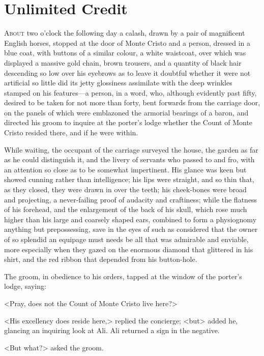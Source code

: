 \chapter{Unlimited Credit} 

 \lettrine{A}{bout} two o'clock the following day a calash, drawn by a pair of magnificent English horses, stopped at the door of Monte Cristo and a person, dressed in a blue coat, with buttons of a similar colour, a white waistcoat, over which was displayed a massive gold chain, brown trousers, and a quantity of black hair descending so low over his eyebrows as to leave it doubtful whether it were not artificial so little did its jetty glossiness assimilate with the deep wrinkles stamped on his features—a person, in a word, who, although evidently past fifty, desired to be taken for not more than forty, bent forwards from the carriage door, on the panels of which were emblazoned the armorial bearings of a baron, and directed his groom to inquire at the porter's lodge whether the Count of Monte Cristo resided there, and if he were within. 

 While waiting, the occupant of the carriage surveyed the house, the garden as far as he could distinguish it, and the livery of servants who passed to and fro, with an attention so close as to be somewhat impertinent. His glance was keen but showed cunning rather than intelligence; his lips were straight, and so thin that, as they closed, they were drawn in over the teeth; his cheek-bones were broad and projecting, a never-failing proof of audacity and craftiness; while the flatness of his forehead, and the enlargement of the back of his skull, which rose much higher than his large and coarsely shaped ears, combined to form a physiognomy anything but prepossessing, save in the eyes of such as considered that the owner of so splendid an equipage must needs be all that was admirable and enviable, more especially when they gazed on the enormous diamond that glittered in his shirt, and the red ribbon that depended from his button-hole. 

 The groom, in obedience to his orders, tapped at the window of the porter's lodge, saying: 

 <Pray, does not the Count of Monte Cristo live here?> 

 <His excellency does reside here,> replied the concierge; <but\longdash> added he, glancing an inquiring look at Ali. Ali returned a sign in the negative. 

 <But what?> asked the groom. 

